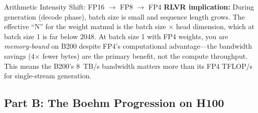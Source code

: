 \begin{thinkfirst}{Arithmetic Intensity Shift: FP16 $\to$ FP8 $\to$ FP4}
\textbf{RLVR implication:} During generation (decode phase), batch size is small and sequence length grows. The effective ``N'' for the weight matmul is the batch size $\times$ head dimension, which at batch size 1 is far below 2048. At batch size 1 with FP4 weights, you are \textit{memory-bound} on B200 despite FP4's computational advantage---the bandwidth savings (4$\times$ fewer bytes) are the primary benefit, not the compute throughput. This means the B200's 8~TB/s bandwidth matters more than its FP4 TFLOP/s for single-stream generation.
\end{thinkfirst}

\subsection{Part B: The Boehm Progression on H100}

